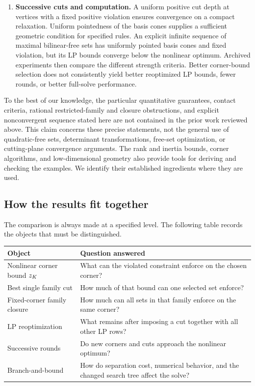 \begin{enumerate}
\item \textbf{Successive cuts and computation.}
A uniform positive cut depth at vertices with a fixed positive violation
ensures convergence on a compact relaxation. Uniform pointedness of
the basis cones supplies a sufficient geometric condition for specified
rules. An explicit infinite sequence of maximal bilinear-free sets has
uniformly pointed basis cones and fixed violation, but its LP bounds
converge below the nonlinear optimum. Archived experiments then compare
the different strength criteria. Better corner-bound selection does not
consistently yield better reoptimized LP bounds, fewer rounds, or better
full-solve performance.
\end{enumerate}

To the best of our knowledge, the particular quantitative guarantees,
contact criteria, rational restricted-family and closure obstructions,
and explicit nonconvergent sequence stated here are not contained in the
prior work reviewed above. This claim concerns these precise statements,
not the general use of quadratic-free sets, determinant transformations,
free-set optimization, or cutting-plane convergence arguments. The
rank and inertia bounds, corner algorithms, and low-dimensional geometry
also provide tools for deriving and checking the examples. We identify
their established ingredients where they are used.

\subsection{How the results fit together}

The comparison is always made at a specified level. The following table
records the objects that must be distinguished.

\begin{center}
\begin{tabular}{p{}p{}}
\toprule
Object & Question answered \\
\midrule
Nonlinear corner bound $z_K$ & What can the violated constraint enforce
on the chosen corner? \\
Best single family cut & How much of that bound can one selected set
enforce? \\
Fixed-corner family closure & How much can all sets in that family enforce
on the same corner? \\
LP reoptimization & What remains after imposing a cut together with all
other LP rows? \\
Successive rounds & Do new corners and cuts approach the nonlinear
optimum? \\
Branch-and-bound & How do separation cost, numerical behavior, and the
changed search tree affect the solve? \\
\bottomrule
\end{tabular}
\end{center}


